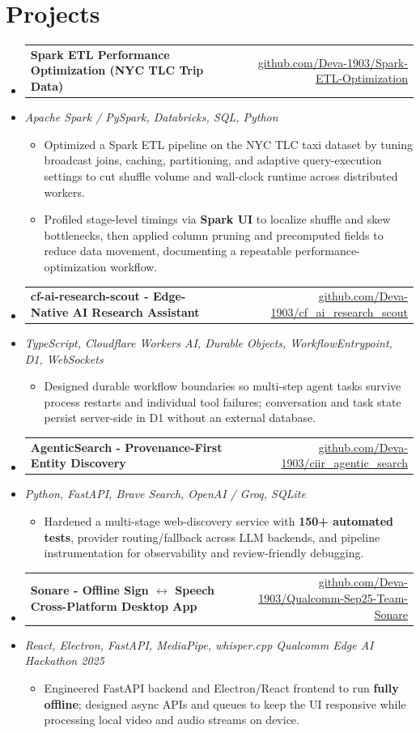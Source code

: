 \documentclass[letterpaper,10pt]{article}
\makeatletter
\newcommand{\resumeItem}[1]{
  \item\small{#1\vspace{-1pt}}
}
\newcommand{\resumeProjectHeading}[2]{
    \item
    \begin{tabular*}{0.985\textwidth}[t]{l@{\extracolsep{\fill}}r}
      \small\textbf{#1} & \small #2 \\
    \end{tabular*}\vspace{-5pt}
}
\newcommand{\resumeProjectSubheading}[1]{
  \vspace{-2pt}\item[] {\small\textcolor{ResumeSlate}{\emph{#1}}}\vspace{-3pt}
}
\newcommand{\resumeSubHeadingListStart}{\begin{itemize}[leftmargin=0.0in, label={}, itemsep=2pt, topsep=2pt]}
\newcommand{\resumeSubHeadingListEnd}{\end{itemize}}
\newcommand{\resumeItemListStart}{\begin{itemize}[leftmargin=0.18in, itemsep=2pt, topsep=1pt]}
\newcommand{\resumeItemListEnd}{\end{itemize}\vspace{-4pt}}
\makeatother
\begin{document}
\section{Projects}
\resumeSubHeadingListStart
  \resumeProjectHeading
    {Spark ETL Performance Optimization (NYC TLC Trip Data)}
    {\href{https://github.com/Deva-1903/Spark-ETL-Optimization}{github.com/Deva-1903/Spark-ETL-Optimization}}
  \resumeProjectSubheading{Apache Spark / PySpark, Databricks, SQL, Python}
    \resumeItemListStart
      \resumeItem{Optimized a Spark ETL pipeline on the NYC TLC taxi dataset by tuning broadcast joins, caching, partitioning, and adaptive query-execution settings to cut shuffle volume and wall-clock runtime across distributed workers.}
      \resumeItem{Profiled stage-level timings via \textbf{Spark UI} to localize shuffle and skew bottlenecks, then applied column pruning and precomputed fields to reduce data movement, documenting a repeatable performance-optimization workflow.}
    \resumeItemListEnd
  \resumeProjectHeading
    {cf-ai-research-scout - Edge-Native AI Research Assistant}
    {\href{https://github.com/Deva-1903/cf_ai_research_scout}{github.com/Deva-1903/cf\_ai\_research\_scout}}
  \resumeProjectSubheading{TypeScript, Cloudflare Workers AI, Durable Objects, WorkflowEntrypoint, D1, WebSockets}
    \resumeItemListStart
      \resumeItem{Designed durable workflow boundaries so multi-step agent tasks survive process restarts and individual tool failures; conversation and task state persist server-side in D1 without an external database.}
    \resumeItemListEnd
  \resumeProjectHeading
    {AgenticSearch - Provenance-First Entity Discovery}
    {\href{https://github.com/Deva-1903/ciir_agentic_search}{github.com/Deva-1903/ciir\_agentic\_search}}
  \resumeProjectSubheading{Python, FastAPI, Brave Search, OpenAI / Groq, SQLite}
    \resumeItemListStart
      \resumeItem{Hardened a multi-stage web-discovery service with \textbf{150+ automated tests}, provider routing/fallback across LLM backends, and pipeline instrumentation for observability and review-friendly debugging.}
    \resumeItemListEnd
  \resumeProjectHeading
    {Sonare - Offline Sign \(\leftrightarrow\) Speech Cross-Platform Desktop App}
    {\href{https://github.com/Deva-1903/Qualcomm-Sep25-Team-Sonare}{github.com/Deva-1903/Qualcomm-Sep25-Team-Sonare}}
  \resumeProjectSubheading{React, Electron, FastAPI, MediaPipe, whisper.cpp \enspace\textbar\enspace Qualcomm Edge AI Hackathon 2025}
    \resumeItemListStart
      \resumeItem{Engineered FastAPI backend and Electron/React frontend to run \textbf{fully offline}; designed async APIs and queues to keep the UI responsive while processing local video and audio streams on device.}
    \resumeItemListEnd
\resumeSubHeadingListEnd
\vspace{-4pt}
\end{document}
